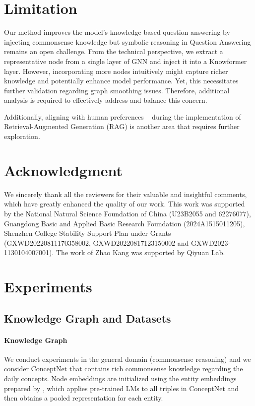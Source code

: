 \documentclass[11pt]{article}
\begin{document}
\section{Limitation}


Our method improves the model's knowledge-based question answering by injecting commonsense knowledge but symbolic reasoning in Question Answering remains an open challenge.
From the technical perspective, we extract a representative node from a single layer of GNN and inject it into a Knowformer layer. However, incorporating more nodes intuitively might capture richer knowledge and potentially enhance model performance. Yet, this necessitates further validation regarding graph smoothing issues. Therefore, additional analysis is required to effectively address and balance this concern.

Additionally, aligning with human preferences ~\cite{preference,preference2} during the implementation of Retrieval-Augmented Generation (RAG) is another area that requires further exploration.
\section*{Acknowledgment}
We sincerely thank all the reviewers for their valuable and insightful comments, which have greatly enhanced the quality of our work. 
This work was supported by the National Natural Science Foundation of China (U23B2055 and 62276077), Guangdong Basic and Applied Basic Research Foundation (2024A1515011205), Shenzhen College Stability Support Plan under Grants (GXWD20220811170358002, GXWD20220817123150002 and GXWD2023-1130104007001).
The work of Zhao Kang was supported by Qiyuan Lab.






\appendix
\section{Experiments}
\label{sec:experiment}
\subsection{Knowledge Graph and Datasets}
\paragraph{Knowledge Graph}
We conduct experiments in the general domain (commonsense reasoning) and we consider ConceptNet \cite{cpnet} that contains rich commonsense knowledge regarding the daily concepts. Node embeddings are initialized using the entity embeddings prepared by \citealt{kagnet}, which applies pre-trained LMs to all triples in ConceptNet and then obtains a pooled representation for each entity.
\end{document}

